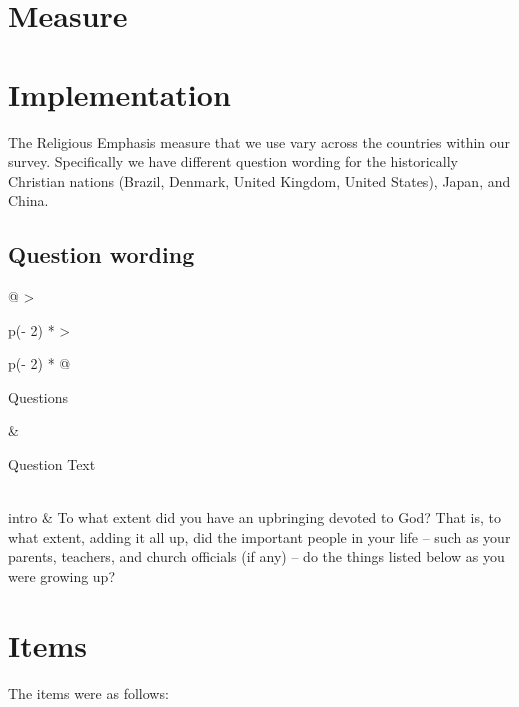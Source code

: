 \documentclass[
  letterpaper,
]{scrbook}
\begin{document}
\section{Measure}\label{measure-6}

\section{Implementation}\label{implementation-6}

The Religious Emphasis measure that we use vary across the countries
within our survey. Specifically we have different question wording for
the historically Christian nations (Brazil, Denmark, United Kingdom,
United States), Japan, and China.

\subsection*{Question wording}\label{question-wording-6}

\begin{longtable}[]{@{}
  >{\raggedright\arraybackslash}p{(\columnwidth - 2\tabcolsep) * }
  >{\raggedright\arraybackslash}p{(\columnwidth - 2\tabcolsep) * }@{}}
\toprule\noalign{}
\begin{minipage}[b]{\linewidth}\raggedright
Questions
\end{minipage} & \begin{minipage}[b]{\linewidth}\raggedright
Question Text
\end{minipage} \\
\midrule\noalign{}
\endhead
\bottomrule\noalign{}
\endlastfoot
intro & To what extent did you have an upbringing devoted to God? That
is, to what extent, adding it all up, did the important people in your
life -- such as your parents, teachers, and church officials (if any) --
do the things listed below as you were growing up? \\
\end{longtable}

\section{Items}\label{items-6}

The items were as follows:
\end{document}
